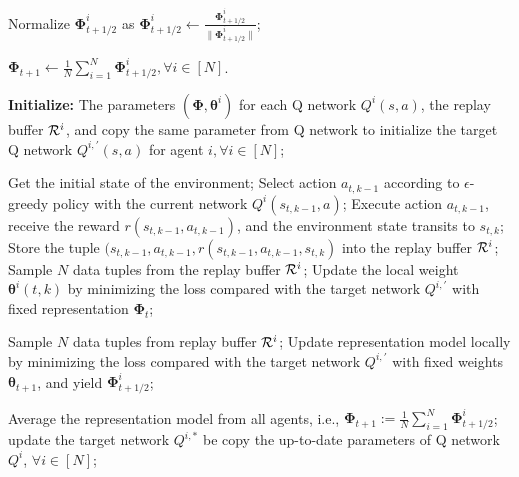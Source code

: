 \documentclass{article} %
\theoremstyle{plain}
\theoremstyle{definition}
\theoremstyle{remark}
\begin{document}
{\begin{algorithm}[h]
\begin{algorithmic}[1]
        \ENDIF
 \STATE Normalize $\pmb{\Phi}_{t+1/2}^i$ as $\pmb{\Phi}_{t+1/2}^i\leftarrow \frac{\pmb{\Phi}_{t+1/2}^i}{\|\pmb{\Phi}_{t+1/2}^i\|}$;
        \ENDFOR
      
        \STATE $\pmb{\Phi}_{t+1}\leftarrow \frac{1}{N}\sum_{i=1}^N\pmb{\Phi}_{t+1/2}^i, \forall i\in[N]$. 
       
		\ENDFOR
	\end{algorithmic}
\end{algorithm}




\begin{algorithm}[h]
	\caption{\textsc{PFedDQN-Rep}} 
	\label{alg:Fed_DQN}
	\textbf{Initialize:} The parameters $(\pmb{\Phi}, \pmb{\theta}^i)$ for each Q network $Q^i(s, a)$,   the replay buffer ${\mathcal{R}}^i$, and copy the  same parameter from Q network to initialize the target Q network $Q^{i, \prime}(s, a)$ for agent $i, \forall i\in[N]$; 
	\begin{algorithmic}[1]
 \STATE Get the initial state of the environment;
        \STATE Select action $a_{t,k-1}$ according to $\epsilon$-greedy policy with the current network $Q^i(s_{t,k-1},a)$;
        \STATE Execute action $a_{t,k-1}$, receive the reward $r(s_{t,k-1}, a_{t,k-1})$, and the environment state transits to $s_{t, k}$; 
        \STATE Store the tuple $(s_{t,k-1}, a_{t,k-1}, r(s_{t,k-1}, a_{t,k-1}, s_{t, k})$ into the replay buffer ${\mathcal{R}}^i$;
        \STATE Sample $N$ data tuples from the replay buffer ${\mathcal{R}}^i$;
        \STATE Update the local weight $\pmb{\theta}^i(t,k)$ by minimizing the loss compared with the target network $Q^{i,\prime}$ with fixed representation $\pmb{\Phi}_t$; 
		
        \ENDFOR
        \STATE Sample $N$ data tuples from replay buffer ${\mathcal{R}}^i$;
        \STATE Update representation model locally by minimizing the loss compared with the target network $Q^{i,\prime}$ with fixed weights $\pmb{\theta}_{t+1}$,  and yield $\pmb{\Phi}^i_{t+1/2}$;
       
		\ENDFOR
    \STATE Average the representation model from all agents, i.e., $\pmb{\Phi}_{t+1}:=\frac{1}{N}\sum_{i=1}^N \pmb{\Phi}_{t+1/2}^i$;
  \ENDFOR
  \STATE update the target network $Q^{i,*}$ be copy the up-to-date parameters of Q network $Q^i$, $\forall i\in[N]$;
  \ENDIF
  \ENDFOR
	\end{algorithmic}
\end{algorithm}



}
\end{document}
